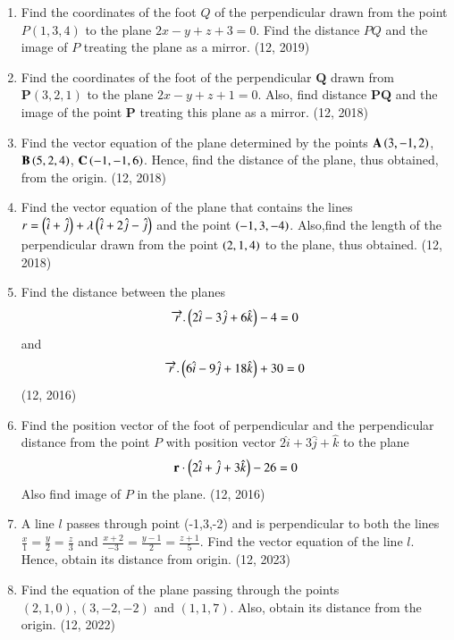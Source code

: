 \begin{enumerate}[label=\thesubsection.\arabic*, ref=\thesubsection.\theenumi]
	\item Find the coordinates of the foot $Q$ of the perpendicular drawn from the point $P(1, 3, 4)$ to the plane $2x - y + z + 3 = 0$. Find the distance $PQ$ and the image of $P$ treating the plane as a mirror. \hfill (12, 2019)
\item Find the coordinates of the foot of the perpendicular $\mathbf{Q}$ drawn from $\mathbf{P}(3, 2, 1)$ to the plane $2x - y + z + 1 = 0$. Also, find distance $\mathbf{PQ}$ and the image of the point $\mathbf{P}$ treating this plane as a mirror.
\hfill (12, 2018)
\item Find the vector equation of the plane determined by the points $\mathbf{A}\left(3,-1,2\right)$, $\mathbf{B}\left(5,2,4\right)$, $\mathbf{C}\left(-1,-1,6\right)$. Hence, find the distance of the plane, thus obtained, from the origin.
\hfill (12, 2018)
\item Find the vector equation of the plane that contains the lines $r=\left(\hat{i}+\hat{j}\right)+\lambda \left(\hat{i}+2\hat{j} - \hat{j}\right)$ and the point $\left(-1,3,-4\right)$. Also,find the length of the perpendicular drawn from the point $\left(2,1,4\right)$ to the plane, thus obtained.
\hfill (12, 2018) 
\item Find the distance between the planes
      \begin{align*}
          \overrightarrow{r}.\begin{pmatrix}2\hat{i}-3\hat{j}+6\hat{k} \end{pmatrix} - 4 =0
      \end{align*}
      and
      \begin{align*}
          \overrightarrow{r}.\begin{pmatrix}6\hat{i}-9\hat{j} +18\hat{k}\end{pmatrix} +30 =0
      \end{align*}
      \hfill (12, 2016)
\item Find the position vector of the foot of perpendicular and the perpendicular distance from the point $P$ with position vector $2\hat{i}+3\hat{j}+\hat{k}$ to the plane
      \begin{align*}
          \mathbf{r}\cdot\left(2\hat{i}+\hat{j}+3\hat{k}\right) - 26=0
      \end{align*}
      Also find image of $P$ in the plane. \hfill (12, 2016)
\item A line $l$ passes through point (-1,3,-2) and is perpendicular to both the lines $\frac {x}{1}=\frac{y}{2}=\frac{z}{3}$ and $\frac {x+2}{-3}=\frac{y-1}{2}=\frac{z+1}{5}$. Find the vector equation of the line $l$. Hence, obtain its distance from origin. \hfill (12, 2023)
\item Find the equation of the plane passing through the points $(2,1,0),(3,-2,-2)$ and $(1,1,7)$. Also, obtain its distance from the origin. \hfill (12, 2022)


\end{enumerate}
